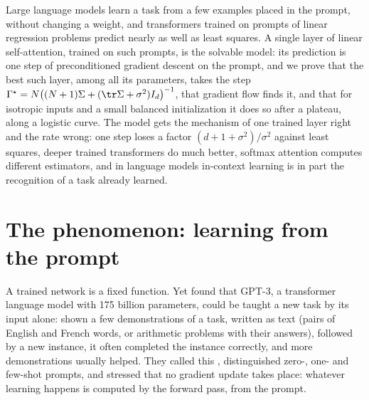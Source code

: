 \newcommand{\iclKQ}{W^{KQ}}
\newcommand{\iclPV}{W^{PV}}
\newcommand{\iclShat}{\hat\Sigma}
\newcommand{\iclc}{\hat c}

\begin{refsection}

\begin{chaptersummary}
Large language models learn a task from a few examples placed in the prompt, without changing a weight, and transformers trained on prompts of linear regression problems predict nearly as well as least squares. A single layer of linear self-attention, trained on such prompts, is the solvable model: its prediction is one step of preconditioned gradient descent on the prompt, and we prove that the best such layer, among all its parameters, takes the step $\Gamma^\star=N\bigl((N+1)\Sigma+(\tr\Sigma+\sigma^2)I_d\bigr)^{-1}$, that gradient flow finds it, and that for isotropic inputs and a small balanced initialization it does so after a plateau, along a logistic curve. The model gets the mechanism of one trained layer right and the rate wrong: one step loses a factor $(d+1+\sigma^2)/\sigma^2$ against least squares, deeper trained transformers do much better, softmax attention computes different estimators, and in language models in-context learning is in part the recognition of a task already learned.
\end{chaptersummary}

\section{The phenomenon: learning from the prompt}\label{sec:icl:phenomenon}

A trained network is a fixed function. Yet \textcite{BrownEtAl2020} found that GPT-3, a transformer language model with 175 billion parameters, could be taught a new task by its input alone: shown a few demonstrations of a task, written as text (pairs of English and French words, or arithmetic problems with their answers), followed by a new instance, it often completed the instance correctly, and more demonstrations usually helped. They called this , distinguished zero-, one- and few-shot prompts, and stressed that no gradient update takes place: whatever learning happens is computed by the forward pass, from the prompt.


\end{refsection}
